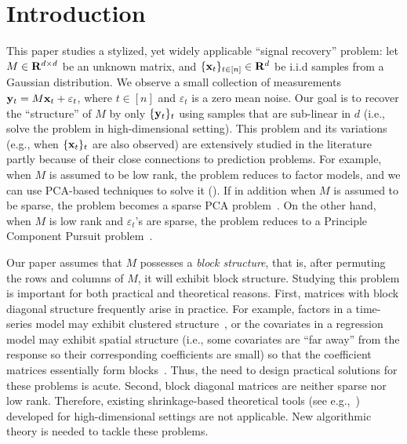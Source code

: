 

\section{Introduction}

This paper studies a stylized, yet widely applicable ``signal recovery'' problem: let $M \in \mathbf{R}^{d \times d}$ be an unknown matrix, and $\{\mathbf{x}_t\}_{t\in [n]} \in \mathbf{R}^{d}$ be i.i.d samples from a Gaussian distribution. We observe a small collection of  measurements $\mathbf{y}_t = M \mathbf{x}_t + \varepsilon_t$, where $t \in [n]$ and $\varepsilon_t$ is a zero mean noise. 
Our goal is to recover the ``structure'' of $M$ by only $\{\mathbf{y}_t\}_t$ using samples that are sub-linear in $d$ (i.e., solve the problem in high-dimensional setting). This problem and its variations (e.g., when $\{\mathbf{x}_t\}_t$ are also observed) are extensively studied in the literature partly because of their close connections to prediction problems. For example, when $M$ is assumed to be low rank, the problem reduces to factor models, and we can use PCA-based techniques to solve it (\cite{stock2011dynamic}). If in addition when $M$
 is assumed to be sparse, the problem becomes a sparse PCA problem~\cite{birnbaum2013minimax}. On the other hand, when $M$ is low rank and $\varepsilon_t$'s are sparse, the problem reduces to a Principle Component Pursuit problem~\cite{zhou2010stable}.
 
 
Our paper assumes that $M$ possesses a \emph{block structure}, that is, after permuting the rows and columns of $M$, it will exhibit block structure. Studying this problem is important for both practical and theoretical reasons. First, matrices with block diagonal structure frequently arise in practice. For example, factors in a time-series model may exhibit clustered structure~\cite{bouveyron2014model}, or the covariates in a regression model may exhibit spatial structure (i.e., some covariates are ``far away'' from the response so their corresponding coefficients are small) so that the coefficient matrices essentially form blocks~\cite{lam2013regularization,lam2016detection,guo2016high,otto2018estimation}. Thus, the need to design practical solutions for these problems is acute. Second, block diagonal matrices are neither sparse nor low rank. Therefore, existing shrinkage-based theoretical tools (see e.g.,~\cite{tibshirani1996regression,negahban2011estimation}) developed for high-dimensional settings are not applicable. New algorithmic theory is needed to tackle these problems. 

